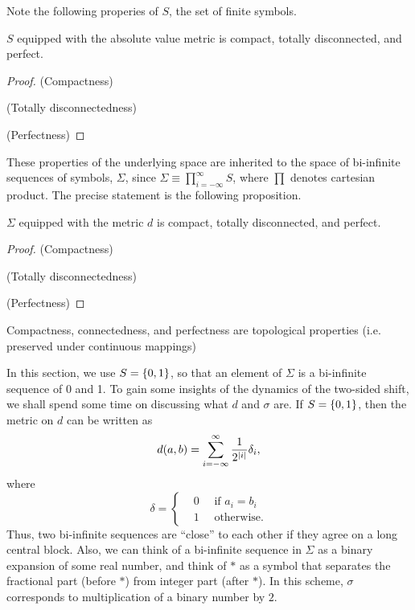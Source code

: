 \documentclass[12pt,twoside]{book}
\begin{document}
\begin{proposition}
\end{proposition}
\begin{proposition}
\end{proposition}
Note the following properies of $S$, the set of finite symbols.
\begin{proposition}
  $S$ equipped with the absolute value metric is compact, totally disconnected, and perfect.
\begin{proof}
  (Compactness)
  
  (Totally disconnectedness)

  (Perfectness)

\end{proof}
\end{proposition}
These properties of the underlying space are inherited to the space of bi-infinite sequences of symbols, $\Sigma$, since $\Sigma \equiv \prod\limits_{i = -\infty}^{\infty} S$, where $\prod$ denotes cartesian product.
The precise statement is the following proposition.
\begin{proposition}
  $\Sigma$ equipped with the metric $d$ is compact, totally disconnected, and perfect.
\begin{proof}
  (Compactness)
  
  (Totally disconnectedness)

  (Perfectness)

\end{proof}
\end{proposition}
\begin{proposition}
  Compactness, connectedness, and perfectness are topological properties (i.e. preserved under continuous mappings)
\end{proposition}

In this section, we use $S = \left \{ 0,1 \right \}$, so that an element of $\Sigma$ is a bi-infinite sequence of 0 and 1.
To gain some insights of the dynamics of the two-sided shift, we shall spend some time on discussing what $d$ and $\sigma$ are.
If $S = \left \{ 0,1 \right \}$, then the metric on $d$ can be written as
\begin{equation*}
  d(a,b) = \sum\limits_{i = -\infty}^{\infty} \frac{1}{2^{\left | i \right |}} \delta_{i},
\end{equation*}
where
\begin{equation*}
  \delta = 
  \begin{cases}
    &0 \quad \mbox{ if } a_i = b_i  \\
    &1 \quad \mbox{ otherwise.}
  \end{cases}
\end{equation*}
Thus, two bi-infinite sequences are ``close'' to each other if they agree on a long central block.
Also, we can think of a bi-infinite sequence in $\Sigma$ as a binary expansion of some real number, and think of $*$ as a symbol that separates the fractional part (before $*$) from integer part (after $*$).
In this scheme, $\sigma$ corresponds to multiplication of a binary number by $2$.
\end{document}
